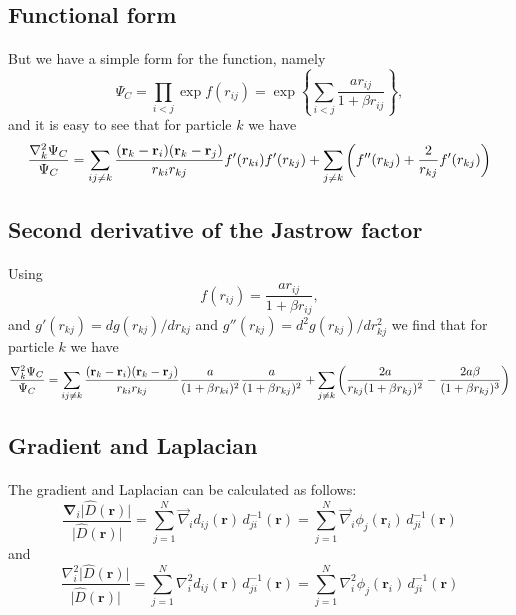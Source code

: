 \documentclass[%
twoside,                 %
final,                   %
10pt]{article}
\begin{document}
\subsection*{Functional form}

\paragraph{}
But we have a simple form for the function, namely
\[
\Psi_{C}=\prod_{i< j}\exp{f(r_{ij})}= \exp{\left\{\sum_{i<j}\frac{ar_{ij}}{1+\beta r_{ij}}\right\}},
\]
and it is easy to see that for particle  $k$
we have
\[
  \frac{\nabla^2_k \Psi_C}{\Psi_C }=
\sum_{ij\ne k}\frac{({\bf r}_k-{\bf r}_i)({\bf r}_k-{\bf r}_j)}{r_{ki}r_{kj}}f'(r_{ki})f'(r_{kj})+
\sum_{j\ne k}\left( f''(r_{kj})+\frac{2}{r_{kj}}f'(r_{kj})\right)
\]



\subsection*{Second derivative of the Jastrow factor}

\paragraph{}
Using 
\[
f(r_{ij})= \frac{ar_{ij}}{1+\beta r_{ij}},
\]
and $g'(r_{kj})=dg(r_{kj})/dr_{kj}$ and 
$g''(r_{kj})=d^2g(r_{kj})/dr_{kj}^2$  we find that for particle  $k$
we have
\[
  \frac{\nabla^2_k \Psi_C}{\Psi_C }=
\sum_{ij\ne k}\frac{({\bf r}_k-{\bf r}_i)({\bf r}_k-{\bf r}_j)}{r_{ki}r_{kj}}\frac{a}{(1+\beta r_{ki})^2}
\frac{a}{(1+\beta r_{kj})^2}+
\sum_{j\ne k}\left(\frac{2a}{r_{kj}(1+\beta r_{kj})^2}-\frac{2a\beta}{(1+\beta r_{kj})^3}\right)
\]



\subsection*{Gradient and Laplacian}

\paragraph{}
The gradient and
Laplacian can be calculated as follows:
\[
\frac{\mathbf{\nabla}_i\vert\hat{D}(\mathbf{r})\vert}
{\vert\hat{D}(\mathbf{r})\vert} =
\sum_{j=1}^N \vec\nabla_i d_{ij}(\mathbf{r})\,
d_{ji}^{-1}(\mathbf{r}) =
\sum_{j=1}^N \vec\nabla_i \phi_j(\mathbf{r}_i)\,
d_{ji}^{-1}(\mathbf{r})
\]
and
\[
\frac{\nabla^2_i\vert\hat{D}(\mathbf{r})\vert}
{\vert\hat{D}(\mathbf{r})\vert} =
\sum_{j=1}^N \nabla^2_i d_{ij}(\mathbf{r})\,
d_{ji}^{-1}(\mathbf{r}) =
\sum_{j=1}^N \nabla^2_i \phi_j(\mathbf{r}_i)\,
d_{ji}^{-1}(\mathbf{r})
\]
\end{document}
